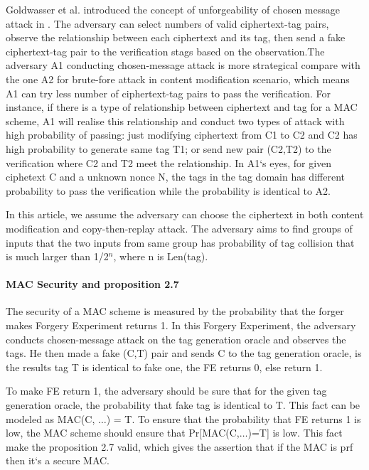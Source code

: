 \documentclass{article}
\begin{document}
Goldwasser et al. introduced the concept of unforgeability of chosen message attack in \cite{}. The adversary can select numbers of valid ciphertext-tag pairs, observe the relationship between each ciphertext and its tag, then send a fake ciphertext-tag pair to the verification stags based on the observation.The adversary A1 conducting chosen-message attack is more strategical compare with the one A2 for brute-fore attack in content modification scenario, which means A1 can try less number of ciphertext-tag pairs to pass the verification. 
For instance, if there is a type of relationship between ciphertext and tag for a MAC scheme, A1 will realise this relationship and conduct two types of attack with high probability of passing: just modifying ciphertext from C1 to C2 and C2 has high probability to generate same tag T1; or send new pair (C2,T2) to the verification where C2 and T2 meet the relationship. In A1`s eyes, for given ciphetext C and a unknown nonce N, the tags in the tag domain has different probability to pass the verification while the probability is identical to A2. 

In this article, we assume the adversary can choose the ciphertext in both content modification and copy-then-replay attack. The adversary aims to find groups of inputs that the two inputs from same group has probability of tag collision that is much larger than 1/2$^n$, where n is Len(tag). 

\paragraph{MAC Security and proposition 2.7}
The security of a MAC scheme is measured by the probability that the forger makes Forgery Experiment returns 1. In this Forgery Experiment, the adversary conducts chosen-message attack on the tag generation oracle and observes the tags. He then made a fake (C,T) pair and sends C to the tag generation oracle, is the results tag T is identical to fake one, the FE returns 0, else return 1.

To make FE return 1, the adversary should be sure that for the given tag generation oracle, the probability that fake tag is identical to T. This fact can be modeled as MAC(C, $\ldots$) = T. To ensure that the probability that FE returns 1 is low, the MAC scheme should ensure that Pr[MAC(C,$\ldots$)=T] is low. 
This fact make the proposition 2.7 valid, which gives the assertion that if the MAC is prf then it`s a secure MAC.
\end{document}
